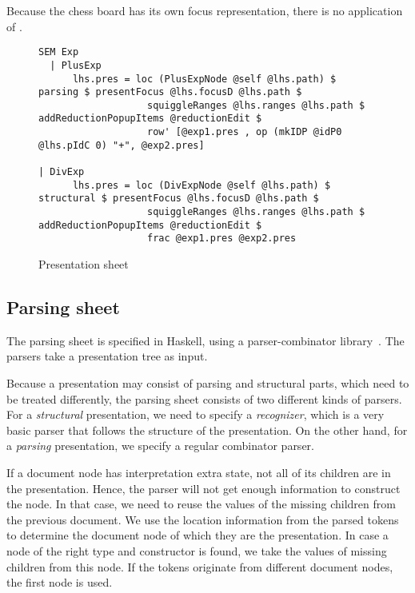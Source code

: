 Because the chess board has its own focus representation, there is no application of .



\bc
\begin{figure}
\begin{small}
\begin{center}
\begin{footnotesize}
\begin{verbatim}
SEM Exp
  | PlusExp
      lhs.pres = loc (PlusExpNode @self @lhs.path) $ parsing $ presentFocus @lhs.focusD @lhs.path $
                   squiggleRanges @lhs.ranges @lhs.path $ addReductionPopupItems @reductionEdit $
                   row' [@exp1.pres , op (mkIDP @idP0 @lhs.pIdC 0) "+", @exp2.pres]

| DivExp      
      lhs.pres = loc (DivExpNode @self @lhs.path) $ structural $ presentFocus @lhs.focusD @lhs.path $
                   squiggleRanges @lhs.ranges @lhs.path $ addReductionPopupItems @reductionEdit $
                   frac @exp1.pres @exp2.pres
\end{verbatim}
\end{footnotesize}
\caption{Presentation sheet}\label{presSheetExample} 
\end{center}
\end{small}
\end{figure}
\ec

\subsection{Parsing sheet}

The parsing sheet is specified in Haskell, using a parser-combinator library~\cite{swierstra01parsers}. The parsers take a presentation tree as input.

Because a presentation may consist of parsing and structural parts, which need to be treated differently, the parsing sheet consists of two different kinds of parsers. For a {\em structural} presentation, we need to specify a {\em recognizer}, which is a very basic parser that follows the structure of the presentation. On the other hand, for a {\em parsing} presentation, we specify a regular combinator parser. 

If a document node has interpretation extra state, not all of its children are in the presentation. Hence, the parser will not get enough information to construct the node. In that case, we need to reuse the values of the missing children from the previous document. We use the location information from the parsed tokens to determine the document node of which they are the presentation. In case a node of the right type and constructor is found, we take the values of missing children from this node. If the tokens originate from different document nodes, the first node is used.

